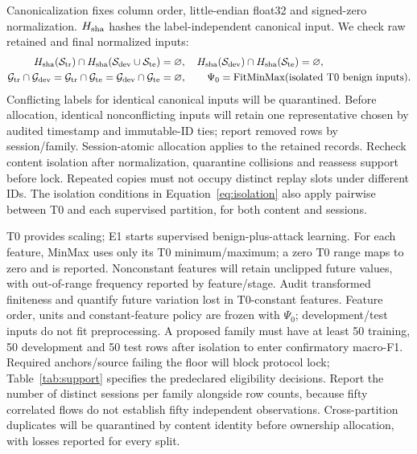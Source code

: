 \documentclass[10pt,a4paper]{article}
\begin{document}
Canonicalization fixes column order, little-endian float32 and signed-zero normalization. $H_{\rm sha}$ hashes the label-independent canonical input. We check raw retained and final normalized inputs:
\begin{equation}
\begin{aligned}
H_{\rm sha}(\mathcal S_{\rm tr})\cap H_{\rm sha}(\mathcal S_{\rm dev}\cup\mathcal S_{\rm te})&=\varnothing,\quad
H_{\rm sha}(\mathcal S_{\rm dev})\cap H_{\rm sha}(\mathcal S_{\rm te})=\varnothing,\\
\mathcal G_{\rm tr}\cap\mathcal G_{\rm dev}=\mathcal G_{\rm tr}\cap\mathcal G_{\rm te}=\mathcal G_{\rm dev}\cap\mathcal G_{\rm te}&=\varnothing,\qquad
\Psi_0=\operatorname{FitMinMax}(\text{isolated T0 benign inputs}).
\end{aligned}
\label{eq:isolation}
\end{equation}
Conflicting labels for identical canonical inputs will be quarantined. Before allocation, identical nonconflicting inputs will retain one representative chosen by audited timestamp and immutable-ID ties; report removed rows by session/family. Session-atomic allocation applies to the retained records. Recheck content isolation after normalization, quarantine collisions and reassess support before lock. Repeated copies must not occupy distinct replay slots under different IDs. The isolation conditions in Equation~\eqref{eq:isolation} also apply pairwise between T0 and each supervised partition, for both content and sessions.

T0 provides scaling; E1 starts supervised benign-plus-attack learning. For each feature, MinMax uses only its T0 minimum/maximum; a zero T0 range maps to zero and is reported. Nonconstant features will retain unclipped future values, with out-of-range frequency reported by feature/stage. Audit transformed finiteness and quantify future variation lost in T0-constant features. Feature order, units and constant-feature policy are frozen with $\Psi_0$; development/test inputs do not fit preprocessing. A proposed family must have at least 50 training, 50 development and 50 test rows after isolation to enter confirmatory macro-F1. Required anchors/source failing the floor will block protocol lock; Table~\ref{tab:support} specifies the predeclared eligibility decisions. Report the number of distinct sessions per family alongside row counts, because fifty correlated flows do not establish fifty independent observations. Cross-partition duplicates will be quarantined by content identity before ownership allocation, with losses reported for every split.
\end{document}
